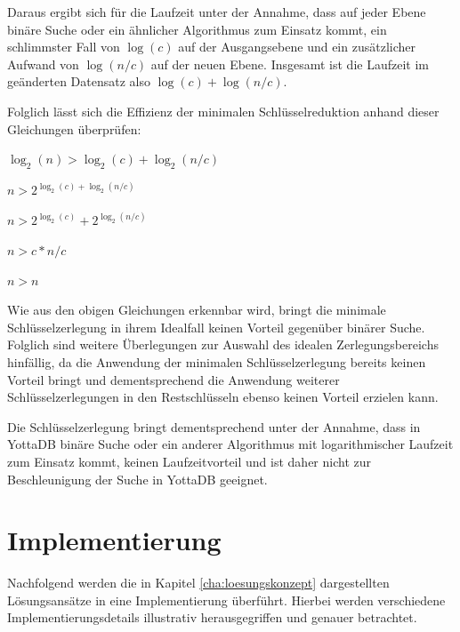 \documentclass[oneside]{ausarbeitung}
\begin{document}
Daraus ergibt sich für die Laufzeit unter der Annahme, dass auf jeder Ebene binäre Suche oder ein ähnlicher Algorithmus zum Einsatz kommt, ein schlimmster Fall von $\log(c)$ auf der Ausgangsebene und ein zusätzlicher Aufwand von $\log(n/c)$ auf der neuen Ebene. Insgesamt ist die Laufzeit im geänderten Datensatz also $\log(c) + \log(n/c)$. 

Folglich lässt sich die Effizienz der minimalen Schlüsselreduktion anhand dieser Gleichungen überprüfen:

\begin{center}
	$\log_2(n) > \log_2(c) + \log_2(n/c)$
	
	$n > 2^{\log_2(c) + \log_2(n/c)}$
	
	$n > 2^{\log_2(c)} + 2^{\log_2(n/c)}$
	
	$n > c * n/c$
	
	$n > n$ \hspace{2mm} \Lightning
\end{center}

Wie aus den obigen Gleichungen erkennbar wird, bringt die minimale Schlüsselzerlegung in ihrem Idealfall keinen Vorteil gegenüber binärer Suche. Folglich sind weitere Überlegungen zur Auswahl des idealen Zerlegungsbereichs hinfällig, da die Anwendung der minimalen Schlüsselzerlegung bereits keinen Vorteil bringt und dementsprechend die Anwendung weiterer Schlüsselzerlegungen in den Restschlüsseln ebenso keinen Vorteil erzielen kann.

Die Schlüsselzerlegung bringt dementsprechend unter der Annahme, dass in YottaDB binäre Suche oder ein anderer Algorithmus mit logarithmischer Laufzeit zum Einsatz kommt, keinen Laufzeitvorteil und ist daher nicht zur Beschleunigung der Suche in YottaDB geeignet.
	
	
	
	











\chapter{Implementierung}
\label{cha:implementierung}

Nachfolgend werden die in Kapitel \ref{cha:loesungskonzept} dargestellten Lösungsansätze in eine Implementierung überführt. Hierbei werden verschiedene Implementierungsdetails illustrativ  herausgegriffen und genauer betrachtet.
\end{document}

